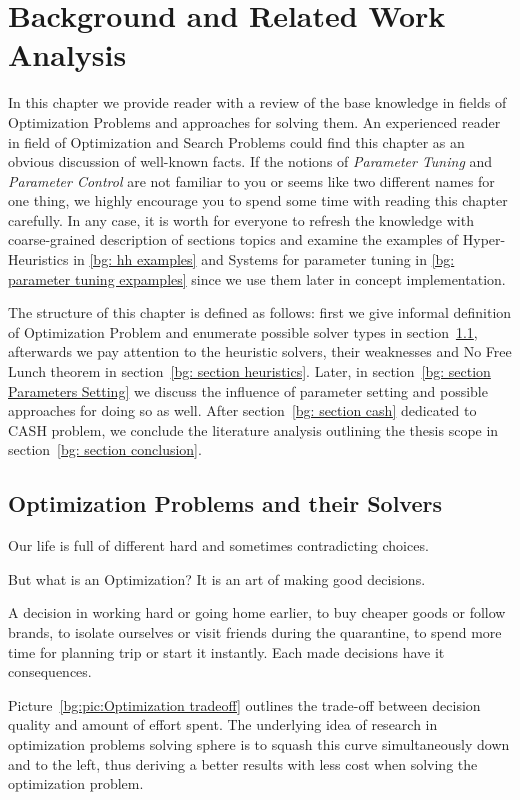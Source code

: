 \chapter{Background and Related Work Analysis}\label{bg}
In this chapter we provide reader with a review of the base knowledge in fields of Optimization Problems and approaches for solving them.
An experienced reader in field of Optimization and Search Problems could find this chapter as an obvious discussion of well-known facts. 
If the notions of \textit{Parameter Tuning} and \textit{Parameter Control} are not familiar to you or seems like two different names for one thing, we highly encourage you to spend some time with reading this chapter carefully.
In any case, it is worth for everyone to refresh the knowledge with coarse-grained description of sections topics and examine the examples of Hyper-Heuristics in \ref{bg: hh examples} and Systems for parameter tuning in \ref{bg: parameter tuning expamples} since we use them later in concept implementation.

The structure of this chapter is defined as follows: first we give informal definition of Optimization Problem and enumerate possible solver types in section~\ref{bg:section problems and solvers}, afterwards we pay attention to the heuristic solvers, their weaknesses and No Free Lunch theorem in section~\ref{bg: section heuristics}. Later, in section~\ref{bg: section Parameters Setting} we discuss the influence of parameter setting and possible approaches for doing so as well. After section~\ref{bg: section cash} dedicated to CASH problem, we conclude the literature analysis outlining the thesis scope in section~\ref{bg: section conclusion}.

\section{Optimization Problems and their Solvers}\label{bg:section problems and solvers}
Our life is full of different hard and sometimes contradicting choices. 

But what is an Optimization? It is an art of making good decisions.

A decision in working hard or going home earlier, to buy cheaper goods or follow brands, to isolate ourselves or visit friends during the quarantine, to spend more time for planning trip or start it instantly. Each made decisions have it consequences.

Picture~\ref{bg:pic:Optimization tradeoff} outlines the trade-off between decision quality and amount of effort spent. The underlying idea of research in optimization problems solving sphere is to squash this curve simultaneously down and to the left, thus deriving a better results with less cost when solving the optimization problem.

